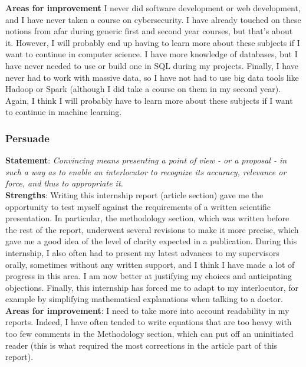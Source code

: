 \documentclass[preprint,12pt]{elsarticle}
\begin{document}
\noindent \textbf{Areas for improvement} I never did software development or web development, and I have never taken a course on cybersecurity. I have already touched on these notions from afar during generic first and second year courses, but that's about it. However, I will probably end up having to learn more about these subjects if I want to continue in computer science. I have more knowledge of databases, but I have never needed to use or build one in SQL during my projects. Finally, I have never had to work with massive data, so I have not had to use big data tools like Hadoop or Spark (although I did take a course on them in my second year). Again, I think I will probably have to learn more about these subjects if I want to continue in machine learning.

\subsubsection{Persuade}

\noindent \textbf{Statement}: \textit{Convincing means presenting a point of view - or a proposal - in such a way as to enable an interlocutor to recognize its accuracy, relevance or force, and thus to appropriate it.}\\[3 pt]

\noindent \textbf{Strengths}: Writing this internship report (article section) gave me the opportunity to test myself against the requirements of a written scientific presentation. In particular, the methodology section, which was written before the rest of the report, underwent several revisions to make it more precise, which gave me a good idea of the level of clarity expected in a publication. During this internship, I also often had to present my latest advances to my supervisors orally, sometimes without any written support, and I think I have made a lot of progress in this area. I am now better at justifying my choices and anticipating objections. Finally, this internship has forced me to adapt to my interlocutor, for example by simplifying mathematical explanations when talking to a doctor.\\[3 pt]

\noindent \textbf{Areas for improvement}: I need to take more into account readability in my reports. Indeed, I have often tended to write equations that are too heavy with too few comments in the Methodology section, which can put off an uninitiated reader (this is what required the most corrections in the article part of this report).
\end{document}
